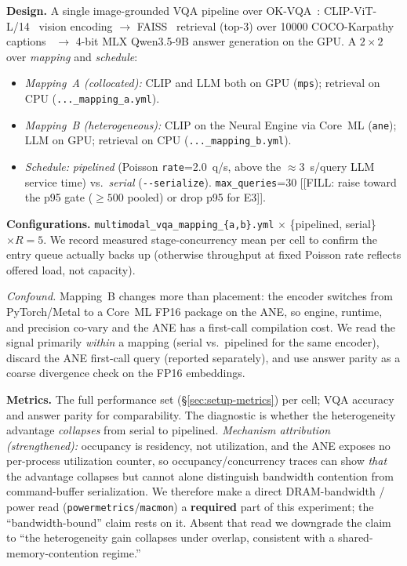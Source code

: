 \textbf{Design.} A single image-grounded VQA pipeline over
OK-VQA~\cite{marino2019okvqa}: CLIP-ViT-L/14~\cite{radford2021clip} vision
encoding $\rightarrow$ FAISS~\cite{johnson2019faiss} retrieval (top-3) over
\num{10000} COCO-Karpathy captions~\cite{lin2014coco,karpathy2015deepvs}
$\rightarrow$ 4-bit MLX Qwen3.5-9B answer generation on the GPU. A
$2\times2$ over \emph{mapping} and \emph{schedule}:
\begin{itemize}
  \item \emph{Mapping~A (collocated):} CLIP and LLM both on GPU
    (\texttt{mps}); retrieval on CPU (\texttt{..._mapping\_a.yml}).
  \item \emph{Mapping~B (heterogeneous):} CLIP on the Neural Engine via
    Core~ML (\texttt{ane}); LLM on GPU; retrieval on CPU
    (\texttt{..._mapping\_b.yml}).
  \item \emph{Schedule:} \emph{pipelined} (Poisson \texttt{rate}=2.0~q/s,
    above the ${\approx}3$~s/query LLM service time) vs.\ \emph{serial}
    (\texttt{-{}-serialize}). \texttt{max\_queries}=30 [[FILL: raise toward
    the p95 gate ($\geq\num{500}$ pooled) or drop p95 for E3]].
\end{itemize}

\textbf{Configurations.} \texttt{multimodal\_vqa\_mapping\_\{a,b\}.yml}
$\times$ \{pipelined, serial\} $\times R{=}5$. We record measured
stage-concurrency mean per cell to confirm the entry queue actually backs
up (otherwise throughput at fixed Poisson rate reflects offered load, not
capacity).

\emph{Confound.} Mapping~B changes more than placement: the encoder
switches from PyTorch/Metal to a Core~ML FP16 package on the ANE, so
engine, runtime, and precision co-vary and the ANE has a first-call
compilation cost. We read the signal primarily \emph{within} a mapping
(serial vs.\ pipelined for the same encoder), discard the ANE first-call
query (reported separately), and use answer parity as a coarse divergence
check on the FP16 embeddings.

\textbf{Metrics.} The full performance set (\S\ref{sec:setup-metrics}) per
cell; VQA accuracy and answer parity for comparability. The diagnostic is
whether the heterogeneity advantage \emph{collapses} from serial to
pipelined. \emph{Mechanism attribution (strengthened):} occupancy is
residency, not utilization, and the ANE exposes no per-process utilization
counter, so occupancy/concurrency traces can show \emph{that} the
advantage collapses but cannot alone distinguish bandwidth contention from
command-buffer serialization. We therefore make a direct DRAM-bandwidth /
power read (\texttt{powermetrics}/\texttt{macmon}) a \textbf{required}
part of this experiment; the ``bandwidth-bound'' claim rests on it. Absent
that read we downgrade the claim to ``the heterogeneity gain collapses
under overlap, consistent with a shared-memory-contention regime.''

